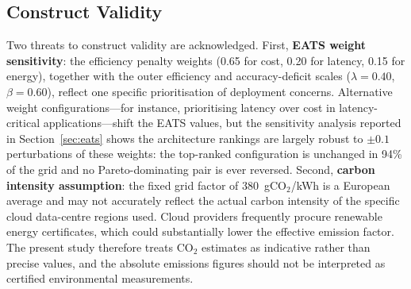 \subsection{Construct Validity}

Two threats to construct validity are acknowledged. First, \textbf{EATS weight sensitivity}: the efficiency penalty weights (0.65 for cost, 0.20 for latency, 0.15 for energy), together with the outer efficiency and accuracy-deficit scales ($\lambda = 0.40$, $\beta = 0.60$), reflect one specific prioritisation of deployment concerns. Alternative weight configurations---for instance, prioritising latency over cost in latency-critical applications---shift the EATS values, but the sensitivity analysis reported in Section~\ref{sec:eats} shows the architecture rankings are largely robust to $\pm 0.1$ perturbations of these weights: the top-ranked configuration is unchanged in 94\% of the grid and no Pareto-dominating pair is ever reversed. Second, \textbf{carbon intensity assumption}: the fixed grid factor of 380~gCO$_2$/kWh is a European average and may not accurately reflect the actual carbon intensity of the specific cloud data-centre regions used. Cloud providers frequently procure renewable energy certificates, which could substantially lower the effective emission factor. The present study therefore treats CO$_2$ estimates as indicative rather than precise values, and the absolute emissions figures should not be interpreted as certified environmental measurements.
